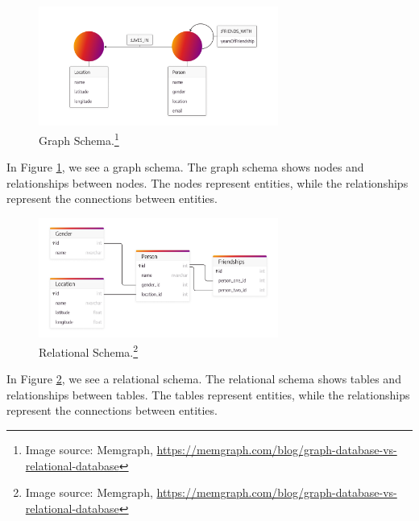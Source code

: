 \begin{figure}[ht]
    \centering
    \includegraphics[width=0.7\textwidth]{assets/memgraph-graph-schema.png}
    \caption{Graph Schema.\protect\footnote{Image source: Memgraph, \url{https://memgraph.com/blog/graph-database-vs-relational-database}}}
    \label{fig:graph_schema}
\end{figure}
In Figure \ref{fig:graph_schema}, we see a graph schema. The graph schema shows nodes and relationships between nodes. The nodes represent entities, while the relationships represent the connections between entities. 

\begin{figure}[ht]
    \centering
    \includegraphics[width=0.7\textwidth]{assets/memgraph-relational-schema.png}
    \caption{Relational Schema.\protect\footnote{Image source: Memgraph, \url{https://memgraph.com/blog/graph-database-vs-relational-database}}}
    \label{fig:relational_schema}
\end{figure}
In Figure \ref{fig:relational_schema}, we see a relational schema. The relational schema shows tables and relationships between tables. The tables represent entities, while the relationships represent the connections between entities.